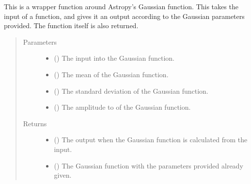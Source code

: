 \documentclass[letterpaper,10pt,english]{sphinxmanual}
\begin{document}
\begin{fulllineitems}
\label{\detokenize{docstrings/ifa_smeargle.core.mathematics:ifa_smeargle.core.mathematics.ifas_gaussian_function}}
This is a wrapper function around Astropy’s Gaussian
function. This takes the input of a function, and gives it an
output according to the Gaussian parameters provided. The
function itself is also returned.
\begin{quote}\begin{description}
\item[{Parameters}] \leavevmode\begin{itemize}
\item {} 
 () \textendash{} The input into the Gaussian function.

\item {} 
 () \textendash{} The mean of the Gaussian function.

\item {} 
 () \textendash{} The standard deviation of the Gaussian function.

\item {} 
 () \textendash{} The amplitude to of the Gaussian function.

\end{itemize}

\item[{Returns}] \leavevmode
\begin{itemize}
\item {} 
 () \textendash{} The output when the Gaussian function is calculated from the
input.

\item {} 
 () \textendash{} The Gaussian function with the parameters provided already
given.

\end{itemize}


\end{description}\end{quote}

\end{fulllineitems}
\end{document}
